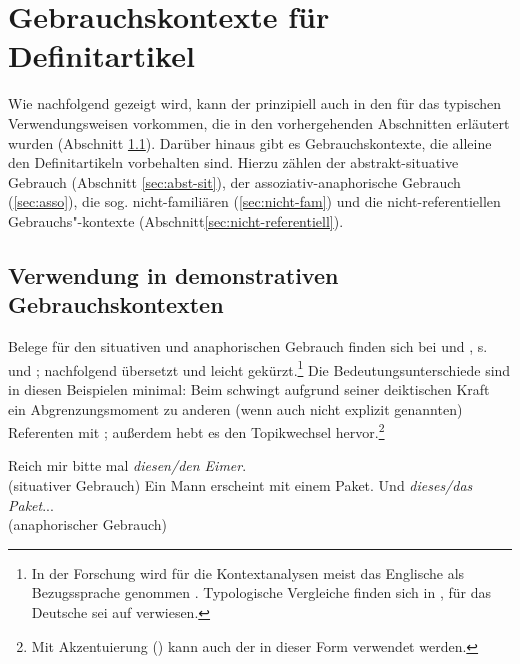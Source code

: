 \section{Gebrauchskontexte für Definitartikel}\label{sec:definitartikel}

Wie nachfolgend gezeigt wird, kann der  prinzipiell auch in den für das  typischen Verwendungsweisen vorkommen, die in den vorhergehenden Abschnitten erläutert wurden (Abschnitt \ref{sec:definitartikel-in-demonstrativ}). Darüber hinaus gibt es Gebrauchskontexte, die alleine den Definitartikeln vorbehalten sind. Hierzu zählen der abstrakt-situative Gebrauch  (Abschnitt \ref{sec:abst-sit}), der assoziativ-anaphorische  Gebrauch (\ref{sec:asso}), die sog. nicht-familiären (\ref{sec:nicht-fam}) und die nicht-referentiellen  Gebrauchs"-kontexte (Abschnitt\ref{sec:nicht-referentiell}). 

\subsection{Verwendung in demonstrativen Gebrauchskontexten}\label{sec:definitartikel-in-demonstrativ}

Belege für den situativen  und anaphorischen  Gebrauch finden sich bei \textcite[110--111]{Hawkins1978} und \textcite[36]{Himmelmann1997}, s.  und ; nachfolgend übersetzt und leicht gekürzt.\footnote{In der Forschung wird für die Kontextanalysen meist das Englische als Bezugssprache genommen \parencite{Christophersen1939, Lobner1985,Lyons1999}. Typologische Vergleiche finden sich in \textcite{Himmelmann1997}, für das Deutsche sei auf \textcite{Bisle-Muller1991} verwiesen.} Die Bedeutungsunterschiede sind in diesen Beispielen minimal: Beim  schwingt aufgrund seiner deiktischen Kraft ein Abgrenzungsmoment zu anderen (wenn auch nicht explizit genannten) Referenten mit \parencite{Bisle-Muller1991}; außerdem hebt es den Topikwechsel  hervor.\footnote{Mit Akzentuierung () kann auch der  in dieser Form verwendet werden.}   

\begin{exe}
	\ex \label{ex:sitdef} Reich mir bitte mal \textit{diesen/den Eimer}.  \\(situativer  Gebrauch)
	\ex \label{ex:anadef} Ein Mann erscheint mit einem Paket. Und \textit{dieses/das Paket}... \\(anaphorischer Gebrauch)
\end{exe}

